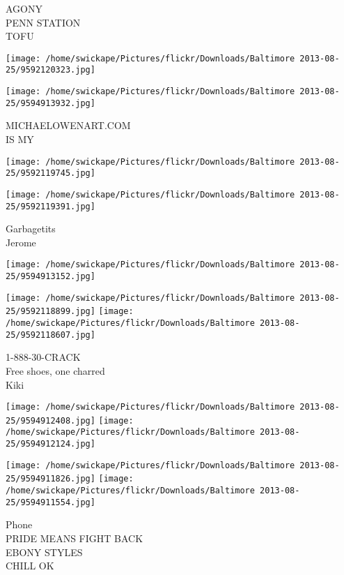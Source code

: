 \documentclass[10pt,letterpaper]{article}
\begin{document}
AGONY\\
PENN STATION\\
TOFU\\
\pagebreak

\texttt{[image: /home/swickape/Pictures/flickr/Downloads/Baltimore 2013-08-25/9592120323.jpg]}

\vspace{0.25in}
\texttt{[image: /home/swickape/Pictures/flickr/Downloads/Baltimore 2013-08-25/9594913932.jpg]}

MICHAELOWENART.COM\\
IS MY\\
\pagebreak

\texttt{[image: /home/swickape/Pictures/flickr/Downloads/Baltimore 2013-08-25/9592119745.jpg]}

\vspace{0.25in}
\texttt{[image: /home/swickape/Pictures/flickr/Downloads/Baltimore 2013-08-25/9592119391.jpg]}

Garbagetits\\
Jerome\\
\pagebreak

\texttt{[image: /home/swickape/Pictures/flickr/Downloads/Baltimore 2013-08-25/9594913152.jpg]}

\vspace{0.25in}
\texttt{[image: /home/swickape/Pictures/flickr/Downloads/Baltimore 2013-08-25/9592118899.jpg]}
\texttt{[image: /home/swickape/Pictures/flickr/Downloads/Baltimore 2013-08-25/9592118607.jpg]}

1{-}888{-}30{-}CRACK\\
Free shoes, one charred\\
Kiki\\
\pagebreak

\texttt{[image: /home/swickape/Pictures/flickr/Downloads/Baltimore 2013-08-25/9594912408.jpg]}
\texttt{[image: /home/swickape/Pictures/flickr/Downloads/Baltimore 2013-08-25/9594912124.jpg]}

\texttt{[image: /home/swickape/Pictures/flickr/Downloads/Baltimore 2013-08-25/9594911826.jpg]}
\texttt{[image: /home/swickape/Pictures/flickr/Downloads/Baltimore 2013-08-25/9594911554.jpg]}

Phone\\
PRIDE MEANS FIGHT BACK\\
EBONY STYLES\\
CHILL OK\\
\pagebreak
\end{document}
